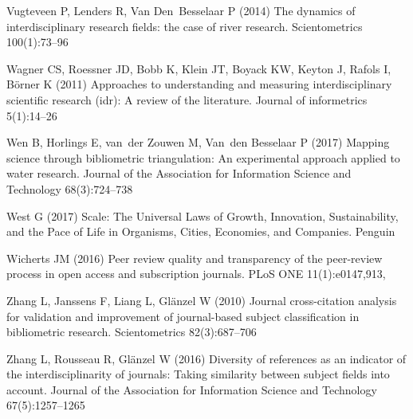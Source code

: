 \begin{thebibliography}{84}
Vugteveen P, Lenders R, Van Den~Besselaar P (2014) The dynamics of
  interdisciplinary research fields: the case of river research. Scientometrics
  100(1):73--96

Wagner CS, Roessner JD, Bobb K, Klein JT, Boyack KW, Keyton J, Rafols I,
  B{\"o}rner K (2011) Approaches to understanding and measuring
  interdisciplinary scientific research (idr): A review of the literature.
  Journal of informetrics 5(1):14--26

Wen B, Horlings E, van~der Zouwen M, Van~den Besselaar P (2017) Mapping science
  through bibliometric triangulation: An experimental approach applied to water
  research. Journal of the Association for Information Science and Technology
  68(3):724--738

West G (2017) Scale: The Universal Laws of Growth, Innovation, Sustainability,
  and the Pace of Life in Organisms, Cities, Economies, and Companies. Penguin

Wicherts JM (2016) Peer review quality and transparency of the peer-review
  process in open access and subscription journals. PLoS ONE 11(1):e0147,913,

Zhang L, Janssens F, Liang L, Gl{\"a}nzel W (2010) Journal cross-citation
  analysis for validation and improvement of journal-based subject
  classification in bibliometric research. Scientometrics 82(3):687--706

Zhang L, Rousseau R, Gl{\"a}nzel W (2016) Diversity of references as an
  indicator of the interdisciplinarity of journals: Taking similarity between
  subject fields into account. Journal of the Association for Information
  Science and Technology 67(5):1257--1265

\end{thebibliography}




